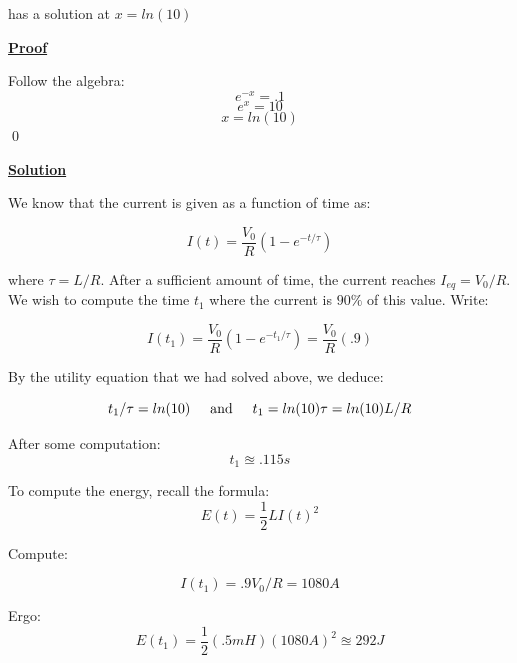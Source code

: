 \documentclass{article}
\newcommand{\new}[1]{
    \vspace{2mm}
    \noindent
    \textbf{
    \underline{#1}}
}
\newcommand{\Proof}{{
    \vspace{2mm}
    \noindent
    \textbf{
    \underline{Proof}}
}
}
\newcommand{\textAnd}{
    {
        \hspace{5mm}
        \textrm{and}
        \hspace{5mm}
    }
}
\begin{document}
has a solution at $x = ln(10)$

\Proof
Follow the algebra:
\[
    e^{-x} = .1
\]
\[
    e^{x} = 10
\]
\[
    x = ln(10)
\]
\qed

\new{Solution}
We know that the current is given as a function of time as:

\[
    I(t) = 
    \frac{V_0}{R}
    (1 - e^{-t/\tau})
\]

where $\tau = L/R$. After a sufficient amount of time, the current 
reaches $I_{eq} = V_0/R$. We wish to compute the time $t_1$ where 
the current is $90\%$ of this value. Write:

\[
    I(t_1) = 
     \frac{V_0}{R}
    (1 - e^{-t_1/\tau}) = 
    \frac{V_0}{R} (.9)
\]

By the utility equation that we had solved above, we deduce:

\[
    t_1/\tau = ln(10)
    \textAnd 
    t_1 = ln(10) \tau = ln(10) L/R
\]

After some computation:
\[
    t_1 \approxeq .115 s
\]

To compute the energy, recall the formula:
\[
    E(t) = \frac{1}{2} LI(t)^2
\]

Compute:

\[
    I(t_1) = .9V_0/R = 1080A
\]

Ergo:
\[
    \boxed{
    E(t_1) = \frac{1}{2}
    (.5mH)(1080A)^2
    \approxeq
    292J
    }
\]
\end{document}
